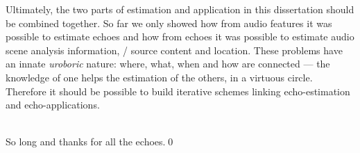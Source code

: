 Ultimately, the two parts of estimation and application in this dissertation should be combined together.
So far we only showed how from audio features it was possible to estimate echoes and how from echoes it was possible to estimate audio scene analysis information, \eg/ source content and location.
These problems have an innate \textit{uroboric} nature: where, what, when and how are connected --- the knowledge of one helps the estimation of the others, in a virtuous circle.
Therefore it should be possible to build iterative schemes linking echo-estimation and echo-applications.

\mynewline
\\So long and thanks for all the echoes.\qed
